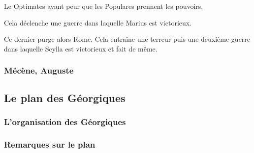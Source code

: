 \documentclass[a4paper, 11pt, hidelinks]{article}
\begin{document}
Le Optimates ayant peur que les Populares prennent les pouvoirs.

Cela déclenche une guerre dans laquelle Marius est victorieux.

Ce dernier purge alors Rome. Cela entraîne une terreur puis une deuxième guerre dans laquelle Scylla est victorieux et fait de même.









\subsubsection{Mécène, Auguste}







\subsection{Le plan des Géorgiques}

\subsubsection{L'organisation des Géorgiques}


\subsubsection{Remarques sur le plan}
\end{document}

